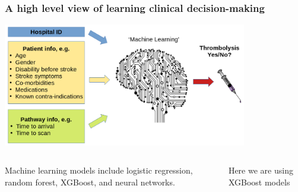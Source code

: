 \documentclass[xcolor={usenames,dvipsnames}]{beamer}
\begin{document}
\begin{frame}
\frametitle{A high level view of learning clinical decision-making}

\includegraphics[width=0.8\textwidth]{./images/treatment_decision}


\begin{columns}
    \footnotesize
    Machine learning models include logistic regression,
    random forest, XGBoost, and neural networks. 
    
    \vspace{1em}
    
    Here we are using XGBoost models
    \normalsize 
\end{columns}




\end{frame}




\end{document}
